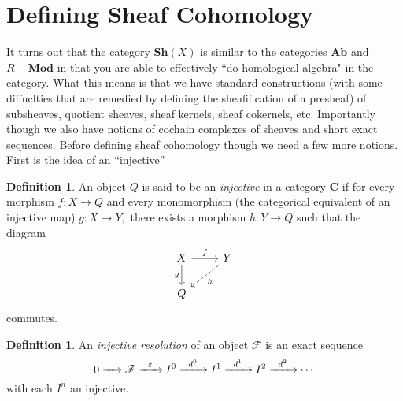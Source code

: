 \documentclass[psamsfonts]{amsart}
\theoremstyle{definition}
\newtheorem{defn}[thm]{Definition}
\theoremstyle{remark}
\numberwithin{equation}{section}
\begin{document}
\section{Defining Sheaf Cohomology}
  It turns out that the category $\textbf{Sh}(X)$ is similar to the categories $\textbf{Ab}$ and $R-\textbf{Mod}$ in that you are able to effectively ``do homological algebra" in the category. What this means is that we have standard constructions (with some diffuclties that are remedied by defining the sheafification of a presheaf) of subsheaves, quotient sheaves, sheaf kernels, sheaf cokernels, etc. Importantly though we also have notions of cochain complexes of sheaves and short exact sequences. \cite{cuboulder} Before defining sheaf cohomology though we need a few more notions. First is the idea of an ``injective''

  \begin{defn}
    An object $Q$ is said to be an \textit{injective} in a category \textbf{C} if for every morphism $f: X \to Q$ and every monomorphism (the categorical equivalent of an injective map) $g: X \to Y,$ there exists a morphism $h: Y \to Q$ such that the diagram
    \[\begin{tikzcd}
      X & Y \\
      Q
      \arrow["f", from=1-1, to=1-2]
      \arrow["g"', from=1-1, to=2-1]
      \arrow["h", dashed, from=1-2, to=2-1]
    \end{tikzcd}\]
    commutes.
  \end{defn}

  \begin{defn}
    An \textit{injective resolution} of an object $\mathscr{F}$ is an exact sequence
    \[0 \xrightarrow{\hspace{.2cm} \hspace{.2cm}} \mathscr{F} \xrightarrow{\hspace{.2cm} \varepsilon \hspace{.2cm}}I^0 \xrightarrow{\hspace{.2cm} d^0 \hspace{.2cm}} I^1 \xrightarrow{\hspace{.2cm} d^1 \hspace{.2cm}} I^2 \xrightarrow{\hspace{.2cm} d^2 \hspace{.2cm}} \cdots \] 
    with each $I^n$ an injective.
  \end{defn}
\end{document}
